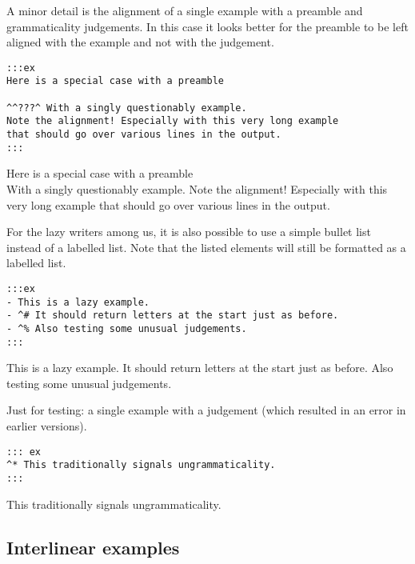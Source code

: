 \documentclass[
]{article}
\begin{document}
A minor detail is the alignment of a single example with a preamble and
grammaticality judgements. In this case it looks better for the preamble
to be left aligned with the example and not with the judgement.

\begin{verbatim}
:::ex
Here is a special case with a preamble

^^???^ With a singly questionably example.
Note the alignment! Especially with this very long example
that should go over various lines in the output.
:::
\end{verbatim}

\begin{samepage}
 Here is a special case with a preamble\\
  
   With a singly questionably example. Note
the alignment! Especially with this very long example that should go
over various lines in the output.
\xe
\end{samepage}

For the lazy writers among us, it is also possible to use a simple
bullet list instead of a labelled list. Note that the listed elements
will still be formatted as a labelled list.

\begin{verbatim}
:::ex
- This is a lazy example.
- ^# It should return letters at the start just as before.
- ^% Also testing some unusual judgements.
:::
\end{verbatim}

\begin{samepage}
  \a This is a lazy example.
  \a \ljudge{\#}It should return letters at the start just as before.
  \a \ljudge{\%}Also testing some unusual judgements.
\xe
\end{samepage}

Just for testing: a single example with a judgement (which resulted in
an error in earlier versions).

\begin{verbatim}
::: ex
^* This traditionally signals ungrammaticality.
:::
\end{verbatim}

\begin{samepage}
  
  \judge{*} This traditionally signals ungrammaticality.
\xe
\end{samepage}

\subsection{Interlinear examples}\label{interlinear-examples}
\end{document}
